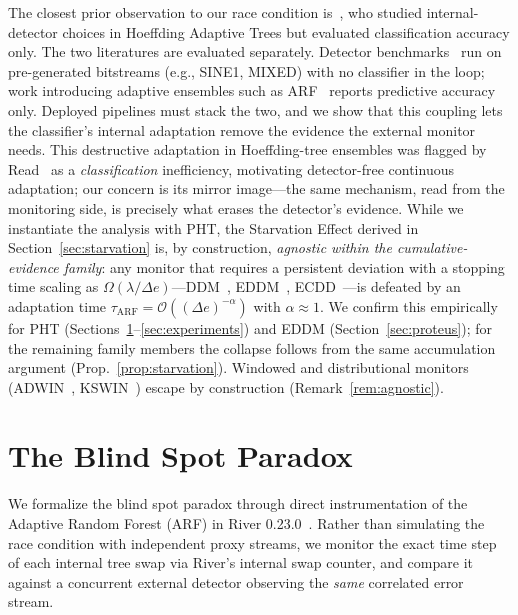 \documentclass[10pt,conference]{IEEEtran}
\theoremstyle{definition}
\begin{document}
The closest prior observation to our race condition is~\cite{stirling_2018}, who studied internal-detector choices in Hoeffding Adaptive Trees but evaluated classification accuracy only.
The two literatures are evaluated separately. Detector benchmarks~\cite{goncalves_2014, lukats_2025} run on pre-generated bitstreams (e.g., SINE1, MIXED) with no classifier in the loop; work introducing adaptive ensembles such as ARF~\cite{gomes_arf_2017} reports predictive accuracy only. Deployed pipelines must stack the two, and we show that this coupling lets the classifier's internal adaptation remove the evidence the external monitor needs. This destructive adaptation in Hoeffding-tree ensembles was flagged by Read~\cite{read_2018} as a \emph{classification} inefficiency, motivating detector-free continuous adaptation; our concern is its mirror image---the same mechanism, read from the monitoring side, is precisely what erases the detector's evidence. While we instantiate the analysis with PHT, the Starvation Effect derived in Section~\ref{sec:starvation} is, by construction, \emph{agnostic within the cumulative-evidence family}: any monitor that requires a persistent deviation with a stopping time scaling as $\Omega(\lambda / \Delta e)$---DDM~\cite{gama_ddm_2004}, EDDM~\cite{baena_eddm_2006}, ECDD~\cite{ross_ecdd_2012}---is defeated by an adaptation time $\tau_{\mathrm{ARF}} = \mathcal{O}((\Delta e)^{-\alpha})$ with $\alpha \approx 1$. We confirm this empirically for PHT (Sections~\ref{sec:blindspot}--\ref{sec:experiments}) and EDDM (Section~\ref{sec:proteus}); for the remaining family members the collapse follows from the same accumulation argument (Prop.~\ref{prop:starvation}). Windowed and distributional monitors (ADWIN~\cite{bifet_adwin_2007}, KSWIN~\cite{raab_kswin_2020}) escape by construction (Remark~\ref{rem:agnostic}).

\section{The Blind Spot Paradox}\label{sec:blindspot}

We formalize the blind spot paradox through direct instrumentation of the Adaptive Random Forest (ARF) in River 0.23.0~\cite{montiel_river_2021}.
Rather than simulating the race condition with independent proxy streams, we monitor the exact time step of each internal tree swap via River's internal swap counter, and compare it against a concurrent external detector observing the \emph{same} correlated error stream.
\end{document}
